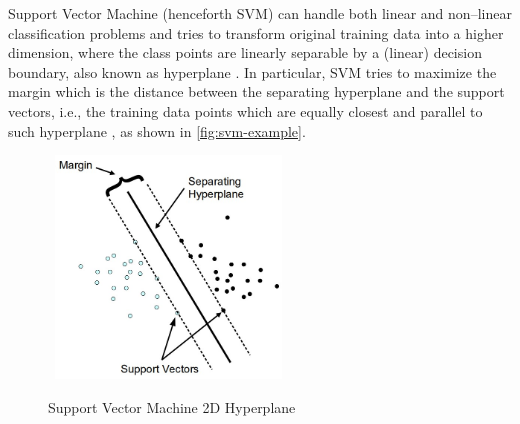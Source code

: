 Support Vector Machine (henceforth SVM) can handle both linear and non--linear classification problems and tries to transform original training data into a higher dimension, where the class points are linearly separable by a (linear) decision boundary, also known as hyperplane \citep{han2011data}.
In particular, SVM tries to maximize the margin which is the distance between the separating hyperplane and the support vectors, i.e., the training data points which are equally closest and parallel to such hyperplane \citep{tatsat2020machine}, as shown in \autoref{fig:svm-example}.

\begin{figure}[H]
    \centering
    \caption{Support Vector Machine 2D Hyperplane}\vspace{0.5em}
    \label{fig:svm-example}\
    \includegraphics[width=60mm]{Figures/svmhyperplane.jpg}

    \vspace{-1em}
\end{figure}

